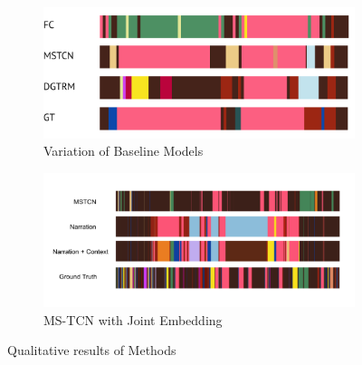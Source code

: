 \begin{figure}[ht!]
\begin{center}
    \begin{minipage}[b]{1\textwidth}
        \begin{subfigure}[b]{0.475\textwidth}
            \centering
            \includegraphics[scale=0.10]{figures/P26_39-comparison.png}
            \caption{Variation of Baseline Models}
            \label{fig:var_baseline}
        \end{subfigure}\quad
        \begin{subfigure}[b]{0.475\textwidth}
            \centering
            \includegraphics[scale=0.2]{figures/mstcn_howto100m.png}
            \caption{MS-TCN with Joint Embedding}
            \label{fig:mstcn_joint}
        \end{subfigure}
        \caption{Qualitative results of Methods}
        \label{fig:baseline_qualitative}
    \end{minipage}
\end{center}
\end{figure}

